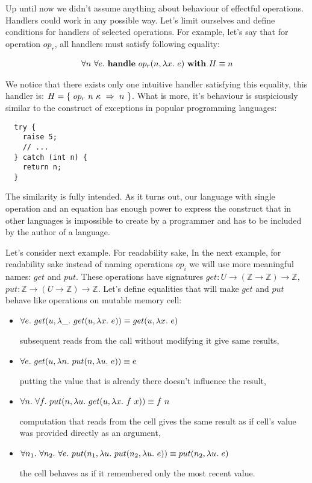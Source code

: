 Up until now we didn't assume anything about behaviour of effectful operations. Handlers could work in any possible way. Let's limit ourselves and define conditions for handlers of selected operations. For example, let's say that for operation \(op_r\), all handlers must satisfy following equality:

\begin{align}
  \forall n\ \forall e.\ \mathbf{handle}\ op_r(n, \lambda x.\ e)\ \mathbf{with}\ H \equiv n
\end{align}

We notice that there exists only one intuitive handler satisfying this equality, this handler is: \(H = \{\ \hcase{op_r}{n\ \kappa}{n} \ \}\). What is more, it's behaviour is suspiciously similar to the construct of exceptions in popular programming languages:

\begin{lstlisting}
  try {
    raise 5;
    // ...
  } catch (int n) {
    return n;
  }
\end{lstlisting}

The similarity is fully intended. As it turns out, our language with single operation and an equation has enough power to express the construct that in other languages is impossible to create by a programmer and has to be included by the author of a language.

Let's consider next example. For readability sake,
In the next example, for readability sake instead of naming operations \(op_i\) we will use more meaningful names: \(get\) and \(put\). These operations have signatures \(get: U \rightarrow (\mathbb{Z} \rightarrow \mathbb{Z}) \rightarrow \mathbb{Z}\), \(put: \mathbb{Z} \rightarrow (U \rightarrow \mathbb{Z}) \rightarrow \mathbb{Z}\). Let's define equalities that will make \(get\) and \(put\) behave like operations on mutable memory cell:

\begin{itemize}
\item \(\forall e.\ get(u, \lambda \_.\ get(u, \lambda x.\ e)) \equiv get(u, \lambda x.\ e)\)

  subsequent reads from the call without modifying it give same results,
\item \(\forall e.\ get(u, \lambda n.\ put(n, \lambda u.\ e)) \equiv e\)

  putting the value that is already there doesn't influence the result,
\item \(\forall n.\ \forall f.\ put(n, \lambda u.\ get(u, \lambda x.\ f\ x)) \equiv f\ n\)

  computation that reads from the cell gives the same result as if cell's value was provided directly as an argument,
\item \(\forall n_1.\ \forall n_2.\ \forall e.\ put(n_1, \lambda u.\ put(n_2, \lambda u.\ e)) \equiv put(n_2, \lambda u.\ e)\)

  the cell behaves as if it remembered only the most recent value.
\end{itemize}

